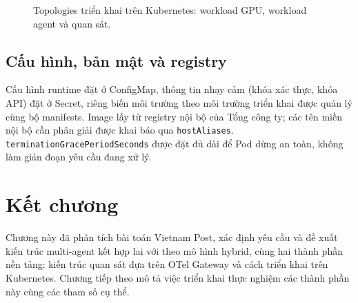 \begin{figure}[htbp]
\centering
{}
\caption{Topologies triển khai trên Kubernetes: workload GPU, workload agent và quan sát.}
\label{fig:k8s}
\end{figure}

\subsection{Cấu hình, bản mật và registry}

Cấu hình runtime đặt ở ConfigMap, thông tin nhạy cảm (khóa xác thực, khóa API) đặt ở Secret,
riêng biến môi trường theo môi trường triển khai được quản lý cùng bộ manifests. Image lấy
từ registry nội bộ của Tổng công ty; các tên miền nội bộ cần phân giải được khai báo qua
\texttt{hostAliases}. \texttt{terminationGracePeriodSeconds} được đặt đủ dài để Pod dừng an
toàn, không làm gián đoạn yêu cầu đang xử lý.

\section*{Kết chương}
Chương này đã phân tích bài toán Vietnam Post, xác định yêu cầu và đề xuất kiến trúc multi-agent
kết hợp \rag{} lai với \ft{} theo mô hình hybrid, cùng hai thành phần nền tảng: kiến trúc
quan sát dựa trên OTel Gateway và cách triển khai trên Kubernetes. Chương tiếp theo mô tả
việc triển khai thực nghiệm các thành phần này cùng các tham số cụ thể.
